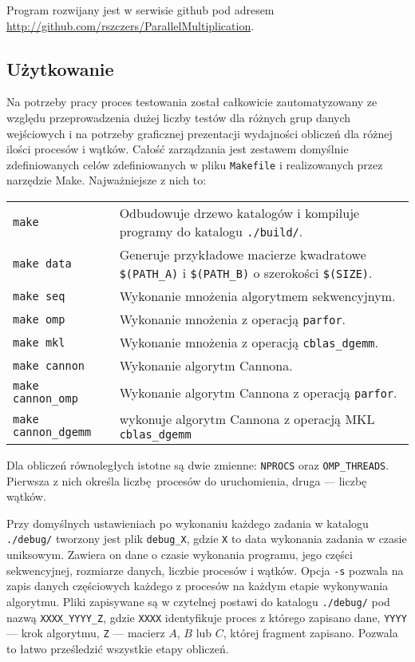 Program rozwijany jest w serwisie github pod adresem \url{http://github.com/rszczers/ParallelMultiplication}.


\subsection{Użytkowanie}
Na potrzeby pracy proces testowania został całkowicie zautomatyzowany ze względu przeprowadzenia dużej liczby testów dla różnych grup danych wejściowych i na potrzeby graficznej prezentacji wydajności obliczeń dla różnej ilości procesów i wątków. Całość zarządzania jest zestawem domyślnie zdefiniowanych celów zdefiniowanych w pliku \texttt{Makefile} i realizowanych przez narzędzie Make. Najważniejsze z nich to:
\vspace{5mm}


\noindent\begin{tabular}{L{4cm}L{9cm}}
\texttt{make} & Odbudowuje drzewo katalogów i kompiluje programy do katalogu \texttt{./build/}. \\
\texttt{make data} & Generuje przykładowe macierze kwadratowe \texttt{\$(PATH\_A)} i \texttt{\$(PATH\_B)} o szerokości \texttt{\$(SIZE)}. \\
\texttt{make seq} & Wykonanie mnożenia algorytmem sekwencyjnym. \\
\texttt{make omp} & Wykonanie mnożenia z operacją \texttt{parfor}. \\
\texttt{make mkl} & Wykonanie mnożenia z operacją \texttt{cblas\_dgemm}. \\
\texttt{make cannon} & Wykonanie algorytm Cannona.\\
\texttt{make cannon\_omp} & Wykonanie algorytm Cannona z operacją \texttt{parfor}.\\ 
\texttt{make cannon\_dgemm} & wykonuje algorytm Cannona z operacją MKL \texttt{cblas\_dgemm}
\end{tabular}


\vspace{5mm}
Dla obliczeń równoległych istotne są dwie zmienne: \texttt{NPROCS} oraz \texttt{OMP\_THR\-EADS}. Pierwsza z nich określa liczbę procesów do uruchomienia, druga --- liczbę wątków.


Przy domyślnych ustawieniach po wykonaniu każdego zadania w katalogu \texttt{./debug/} tworzony jest plik \texttt{debug\_X}, gdzie \texttt{X} to data wykonania zadania w czasie uniksowym. Zawiera on dane o czasie wykonania programu, jego części sekwencyjnej, rozmiarze danych, liczbie procesów i wątków. Opcja \texttt{-s} pozwala na zapis danych częściowych każdego z procesów na każdym etapie wykonywania algorytmu. Pliki zapisywane są w czytelnej postawi do katalogu \texttt{./debug/} pod nazwą \texttt{XXXX\_YYYY\_Z}, gdzie \texttt{XXXX} identyfikuje proces z którego zapisano dane, \texttt{YYYY} --- krok algorytmu, \texttt{Z} --- macierz \(A\), \(B\) lub \(C\), której fragment zapisano. Pozwala to łatwo prześledzić wszystkie etapy obliczeń.

